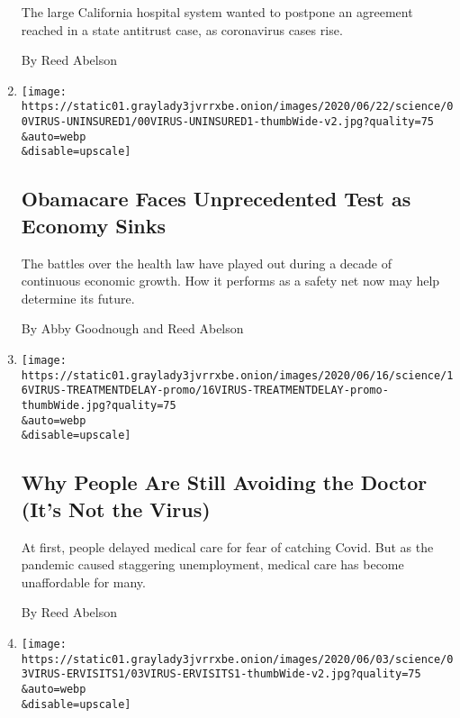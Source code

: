 \begin{enumerate}
  The large California hospital system wanted to postpone an agreement
  reached in a state antitrust case, as coronavirus cases rise.

  By Reed Abelson
\item
  \href{/2020/06/27/health/coronavirus-obamacare-unemployment-health-coverage.html}{}

  \texttt{[image: https://static01.graylady3jvrrxbe.onion/images/2020/06/22/science/00VIRUS-UNINSURED1/00VIRUS-UNINSURED1-thumbWide-v2.jpg?quality=75\\\&auto=webp\\\&disable=upscale]}

  \hypertarget{obamacare-faces-unprecedented-test-as-economy-sinks}{%
  \subsection{Obamacare Faces Unprecedented Test as Economy
  Sinks}\label{obamacare-faces-unprecedented-test-as-economy-sinks}}

  The battles over the health law have played out during a decade of
  continuous economic growth. How it performs as a safety net now may
  help determine its future.

  By Abby Goodnough and Reed Abelson
\item
  \href{/2020/06/16/health/coronavirus-insurance-healthcare.html}{}

  \texttt{[image: https://static01.graylady3jvrrxbe.onion/images/2020/06/16/science/16VIRUS-TREATMENTDELAY-promo/16VIRUS-TREATMENTDELAY-promo-thumbWide.jpg?quality=75\\\&auto=webp\\\&disable=upscale]}

  \hypertarget{why-people-are-still-avoiding-the-doctor-its-not-the-virus}{%
  \subsection{Why People Are Still Avoiding the Doctor (It's Not the
  Virus)}\label{why-people-are-still-avoiding-the-doctor-its-not-the-virus}}

  At first, people delayed medical care for fear of catching Covid. But
  as the pandemic caused staggering unemployment, medical care has
  become unaffordable for many.

  By Reed Abelson
\item
  \href{/2020/06/03/health/hospitals-coronavirus.html}{}

  \texttt{[image: https://static01.graylady3jvrrxbe.onion/images/2020/06/03/science/03VIRUS-ERVISITS1/03VIRUS-ERVISITS1-thumbWide-v2.jpg?quality=75\\\&auto=webp\\\&disable=upscale]}


\end{enumerate}
